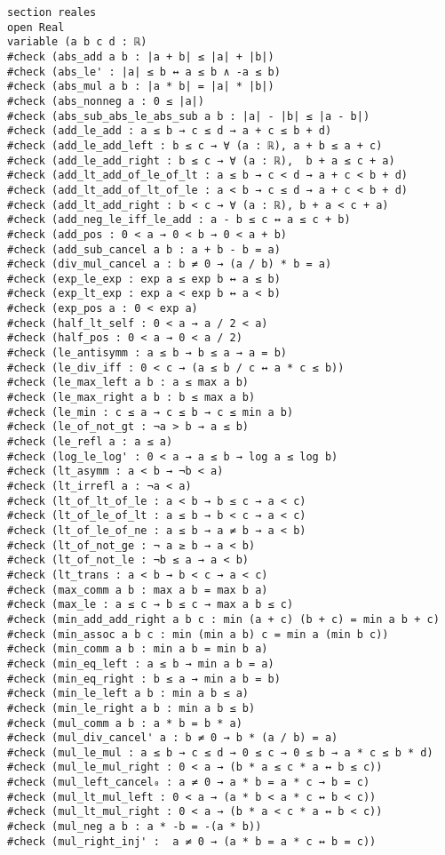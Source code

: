 \begin{verbatim}
section reales
open Real
variable (a b c d : ℝ)
#check (abs_add a b : |a + b| ≤ |a| + |b|)
#check (abs_le' : |a| ≤ b ↔ a ≤ b ∧ -a ≤ b)
#check (abs_mul a b : |a * b| = |a| * |b|)
#check (abs_nonneg a : 0 ≤ |a|)
#check (abs_sub_abs_le_abs_sub a b : |a| - |b| ≤ |a - b|)
#check (add_le_add : a ≤ b → c ≤ d → a + c ≤ b + d)
#check (add_le_add_left : b ≤ c → ∀ (a : ℝ), a + b ≤ a + c)
#check (add_le_add_right : b ≤ c → ∀ (a : ℝ),  b + a ≤ c + a)
#check (add_lt_add_of_le_of_lt : a ≤ b → c < d → a + c < b + d)
#check (add_lt_add_of_lt_of_le : a < b → c ≤ d → a + c < b + d)
#check (add_lt_add_right : b < c → ∀ (a : ℝ), b + a < c + a)
#check (add_neg_le_iff_le_add : a - b ≤ c ↔ a ≤ c + b)
#check (add_pos : 0 < a → 0 < b → 0 < a + b)
#check (add_sub_cancel a b : a + b - b = a)
#check (div_mul_cancel a : b ≠ 0 → (a / b) * b = a)
#check (exp_le_exp : exp a ≤ exp b ↔ a ≤ b)
#check (exp_lt_exp : exp a < exp b ↔ a < b)
#check (exp_pos a : 0 < exp a)
#check (half_lt_self : 0 < a → a / 2 < a)
#check (half_pos : 0 < a → 0 < a / 2)
#check (le_antisymm : a ≤ b → b ≤ a → a = b)
#check (le_div_iff : 0 < c → (a ≤ b / c ↔ a * c ≤ b))
#check (le_max_left a b : a ≤ max a b)
#check (le_max_right a b : b ≤ max a b)
#check (le_min : c ≤ a → c ≤ b → c ≤ min a b)
#check (le_of_not_gt : ¬a > b → a ≤ b)
#check (le_refl a : a ≤ a)
#check (log_le_log' : 0 < a → a ≤ b → log a ≤ log b)
#check (lt_asymm : a < b → ¬b < a)
#check (lt_irrefl a : ¬a < a)
#check (lt_of_lt_of_le : a < b → b ≤ c → a < c)
#check (lt_of_le_of_lt : a ≤ b → b < c → a < c)
#check (lt_of_le_of_ne : a ≤ b → a ≠ b → a < b)
#check (lt_of_not_ge : ¬ a ≥ b → a < b)
#check (lt_of_not_le : ¬b ≤ a → a < b)
#check (lt_trans : a < b → b < c → a < c)
#check (max_comm a b : max a b = max b a)
#check (max_le : a ≤ c → b ≤ c → max a b ≤ c)
#check (min_add_add_right a b c : min (a + c) (b + c) = min a b + c)
#check (min_assoc a b c : min (min a b) c = min a (min b c))
#check (min_comm a b : min a b = min b a)
#check (min_eq_left : a ≤ b → min a b = a)
#check (min_eq_right : b ≤ a → min a b = b)
#check (min_le_left a b : min a b ≤ a)
#check (min_le_right a b : min a b ≤ b)
#check (mul_comm a b : a * b = b * a)
#check (mul_div_cancel' a : b ≠ 0 → b * (a / b) = a)
#check (mul_le_mul : a ≤ b → c ≤ d → 0 ≤ c → 0 ≤ b → a * c ≤ b * d)
#check (mul_le_mul_right : 0 < a → (b * a ≤ c * a ↔ b ≤ c))
#check (mul_left_cancel₀ : a ≠ 0 → a * b = a * c → b = c)
#check (mul_lt_mul_left : 0 < a → (a * b < a * c ↔ b < c))
#check (mul_lt_mul_right : 0 < a → (b * a < c * a ↔ b < c))
#check (mul_neg a b : a * -b = -(a * b))
#check (mul_right_inj' :  a ≠ 0 → (a * b = a * c ↔ b = c))

\end{verbatim}
